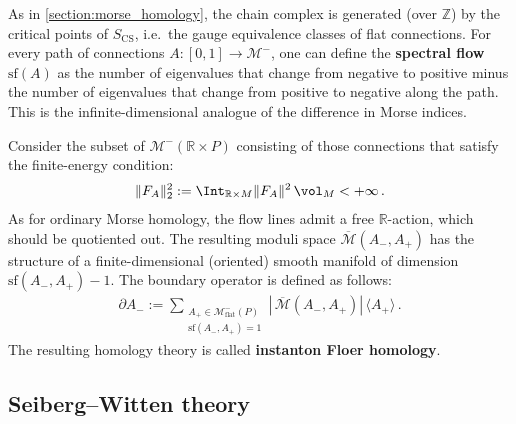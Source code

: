     As in \cref{section:morse_homology}, the chain complex is generated (over $\mathbb{Z}$) by the critical points of $S_{\text{CS}}$, i.e.~the gauge equivalence classes of flat connections. For every path of connections $A:[0,1]\rightarrow\mathcal{M}^-$, one can define the \textbf{spectral flow} $\mathrm{sf}(A)$ as the number of eigenvalues that change from negative to positive minus the number of eigenvalues that change from positive to negative along the path. This is the infinite-dimensional analogue of the difference in Morse indices.

    Consider the subset of $\mathcal{M}^-(\mathbb{R}\times P)$ consisting of those connections that satisfy the finite-energy condition:
    \begin{gather}
        \|F_A\|^2_2 := \Int_{\mathbb{R}\times M}\|F_A\|^2\,\vol_M<+\infty\,.
    \end{gather}
    As for ordinary Morse homology, the flow lines admit a free $\mathbb{R}$-action, which should be quotiented out. The resulting moduli space $\overline{\mathcal{M}}(A_-,A_+)$ has the structure of a finite-dimensional (oriented) smooth manifold of dimension $\mathrm{sf}(A_-,A_+)-1$. The boundary operator is defined as follows:
    \begin{gather}
        \partial A_- := \sum_{\substack{A_+\in\mathcal{M}^-_{\text{flat}}(P)\\\mathrm{sf}(A_-,A_+)=1}}\left|\,\overline{\mathcal{M}}(A_-,A_+)\right|\,\langle A_+ \rangle\,.
    \end{gather}
    The resulting homology theory is called \textbf{instanton Floer homology}.


\subsection{Seiberg--Witten theory}

